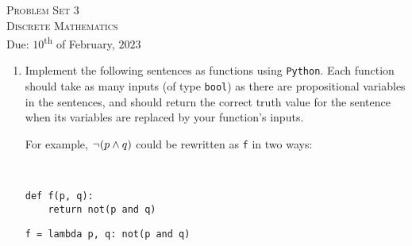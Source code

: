 




\begin{center}
    \textsc{\huge Problem Set 3}\\
    \textsc{Discrete Mathematics}\\
    {\color{gruvred}Due: $10$\textsuperscript{th} of February, $2023$}
\end{center}

\begin{enumerate}
    \item
        Implement the following sentences as functions using \texttt{Python}.
        Each function should take as many inputs (of type \texttt{bool})
        as there are propositional variables in the sentences,
        and should return the correct truth value for the sentence
        when its variables are replaced by your function's inputs.

        \begin{center}
            \begin{minipage}{.3\linewidth}
                For example,
                \(\neg \pn*{p \meet q}\) could be rewritten as \texttt{f} in two ways:
            \end{minipage}%
            \begin{minipage}{.05\linewidth}
                ~
            \end{minipage}%
            \begin{minipage}{.3\linewidth}
\begin{verbatim}def f(p, q):
    return not(p and q)\end{verbatim}
            \end{minipage}%
            \begin{minipage}{.3\linewidth}
\begin{verbatim}f = lambda p, q: not(p and q)\end{verbatim}
            \end{minipage}
        \end{center}


\end{enumerate}
